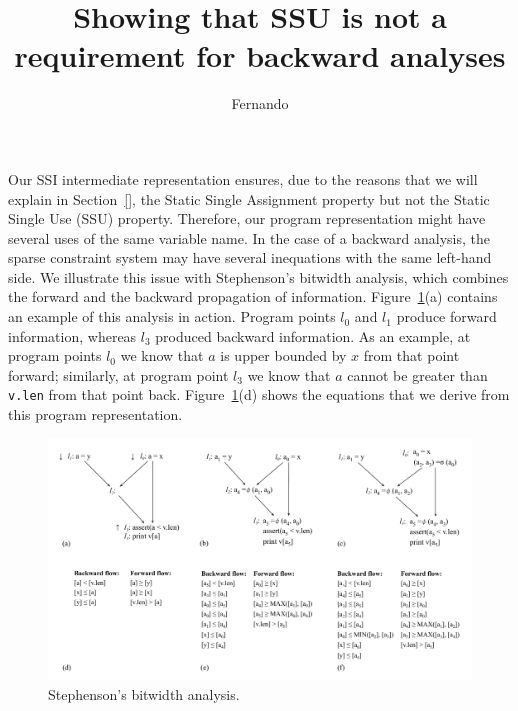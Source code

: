 \documentclass[11pt]{article}
\begin{document}
\title{Showing that SSU is not a requirement for backward analyses}
\author{Fernando}
\maketitle

\def\SSIfy{\textsf{SSIfy}}

Our SSI intermediate representation ensures, due to the reasons that we will explain in Section~\ref{}, the Static Single Assignment property but not the Static Single Use (SSU) property.
Therefore, our program representation might have several uses of the same variable name.
In the case of a backward analysis, the sparse constraint system may have several inequations with the same left-hand side.
We illustrate this issue with Stephenson's bitwidth analysis, which combines the forward and the backward propagation of information.
Figure~\ref{fig:bitwidth}(a) contains an example of this analysis in action.
Program points $l_0$ and $l_1$ produce forward information, whereas $l_3$ produced backward information.
As an example, at program points $l_0$ we know that $a$ is upper bounded by $x$ from that point forward; similarly, at program point $l_3$ we know that $a$ cannot be greater than \texttt{v.len} from that point back.
Figure~\ref{fig:bitwidth}(d) shows the equations that we derive from this program representation.

\begin{figure}[t!]
\centering
\includegraphics[width=\linewidth]{img/bitwidth}
\caption{Stephenson's bitwidth analysis.}
\label{fig:bitwidth}
\end{figure}
\end{document}
